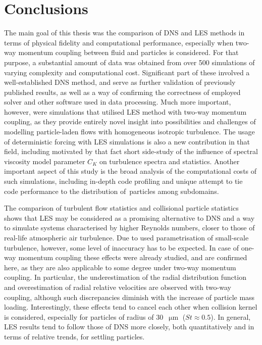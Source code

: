 \documentclass{pracamgren}
\begin{document}
\chapter*{Conclusions}
\label{ch:end}

The main goal of this thesis was the comparison of DNS and LES methods in terms of physical fidelity and computational performance, especially when two-way momentum coupling between fluid and particles is considered.
For that purpose, a substantial amount of data was obtained from over 500 simulations of varying complexity and computational cost.
Significant part of these involved a well-established DNS method, and serve as further validation of previously published results, as well as a way of confirming the correctness of employed solver and other software used in data processing.
Much more important, however, were simulations that utilised LES method with two-way momentum coupling, as they provide entirely novel insight into possibilities and challenges of modelling particle-laden flows with homogeneous isotropic turbulence.
The usage of deterministic forcing with LES simulations is also a new contribution in that field, including motivated by that fact short side-study of the influence of spectral viscosity model parameter $C_K$ on turbulence spectra and statistics.
Another important aspect of this study is the broad analysis of the computational costs of such simulations, including in-depth code profiling and unique attempt to tie code performance to the distribution of~particles among subdomains.

The comparison of turbulent flow statistics and collisional particle statistics shows that LES may be considered as a promising alternative to DNS and a way to simulate systems characterised by higher Reynolds numbers, closer to those of real-life atmospheric air turbulence.
Due to used parametrisation of small-scale turbulence, however, some level of inaccuracy has to be expected.
In case of one-way momentum coupling these effects were already studied, and are confirmed here, as they are also applicable to some degree under two-way momentum coupling.
In particular, the underestimation of the radial distribution function and overestimation of radial relative velocities are observed with two-way coupling, although such discrepancies diminish with the increase of particle mass loading.
Interestingly, these effects tend to cancel each other when collision kernel is considered, especially for particles of radius of $30$~$\upmu\text{m}$ ($St \approx 0.5$).
In general, LES results tend to follow those of DNS more closely, both quantitatively and in terms of relative trends, for settling particles.
\end{document}
